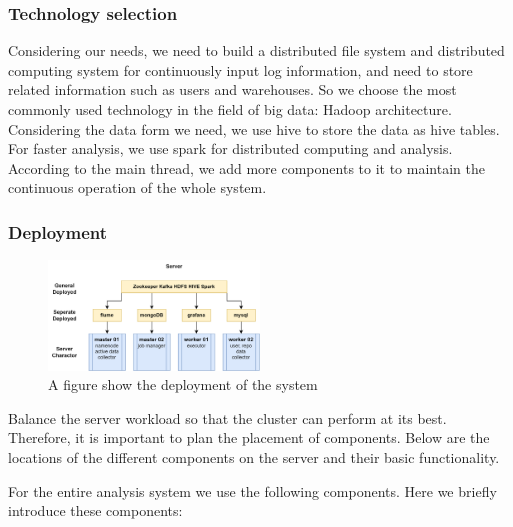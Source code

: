 \subsubsection{Technology selection}

Considering our needs, we need to build a distributed file system and distributed computing system for continuously input log information, and need to store related information such as users and warehouses. So we choose the most commonly used technology in the field of big data: Hadoop architecture. Considering the data form we need, we use hive to store the data as hive tables. For faster analysis, we use spark for distributed computing and analysis. According to the main thread, we add more components to it to maintain the continuous operation of the whole system.



\subsubsection{Deployment}

\begin{figure}[H]
    \centering
    \includegraphics[width=0.5\textwidth]{./pic/deploy.png}
    \caption{A figure show the deployment of the system}
    \label{fig:deploy}
\end{figure}

Balance the server workload so that the cluster can perform at its best. Therefore, it is important to plan the placement of components. Below are the locations of the different components on the server and their basic functionality.


For the entire analysis system we use the following components. Here we briefly introduce these components:

